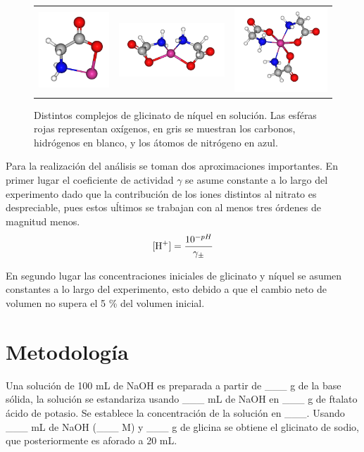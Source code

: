 \documentclass[fleqn,10pt]{SelfArx} %
\begin{document}
    \begin{figure}[h]
       	\centering
       	\begin{tabular}{ccc}
       		\includegraphics[width=0.2\linewidth]{images/Single.png} & \includegraphics[width=0.4\linewidth]{images/Double.png} &
       		\includegraphics[width=0.3\linewidth]{images/Triple.png}
       	\end{tabular}
       	\caption{Distintos complejos de glicinato de n\'iquel en soluci\'on. Las esf\'eras rojas representan ox\'igenos, en gris se muestran los carbonos, hidr\'ogenos en blanco, y los \'atomos de nitr\'ogeno en azul.}
       	\label{fig:ligands}
    \end{figure} 
    
    Para la realizaci\'on del an\'alisis se toman dos aproximaciones importantes. En primer lugar el coeficiente de actividad $\gamma$ se asume constante a lo largo del experimento dado que la contribuci\'on de los iones distintos al nitrato es despreciable, pues estos u\'ltimos se trabajan con al menos tres \'ordenes de magnitud menos.
    \begin{equation}
	    \ce{[H+]} = \dfrac{10^{-pH}}{\gamma_\pm}
    \end{equation}
    
    En segundo lugar las concentraciones iniciales de glicinato y n\'iquel se asumen constantes a lo largo del experimento, esto debido a que el cambio neto de volumen no supera el 5 \% del volumen inicial.
   
    
	\section{Metodolog\'ia}
	Una soluci\'on de 100 mL de NaOH es preparada a partir de \_\_\_ g de la base s\'olida, la soluci\'on se estandariza usando \_\_\_ mL de NaOH en \_\_\_ g de ftalato \'acido de potasio. Se establece la concentraci\'on de la soluci\'on en \_\_\_. Usando \_\_\_ mL de NaOH (\_\_\_ M) y \_\_\_ g de glicina se obtiene el glicinato de sodio, que posteriormente es aforado a 20 mL.
	
\end{document}
